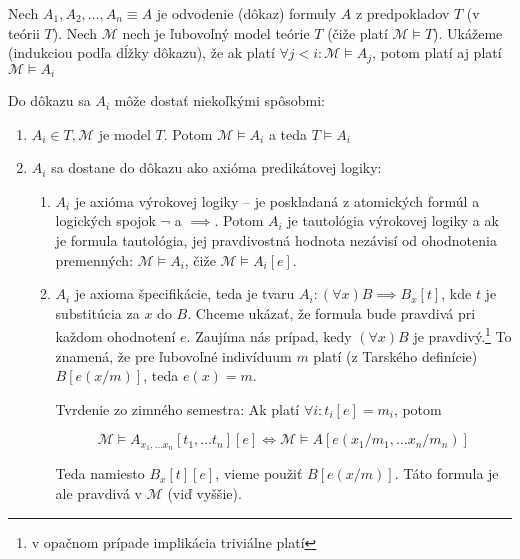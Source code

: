 \begin{dokaz}
    Nech $A_1, A_2, \ldots, A_n\equiv A$ je odvodenie (dôkaz) formuly $A$
    z predpokladov $T$ (v teórii $T$).
    Nech $\mathcal{M}$ nech je ľubovoľný model teórie $T$ 
    (čiže platí $\mathcal{M} \models T$).
    Ukážeme (indukciou podľa dĺžky dôkazu), že 
    ak platí $\forall j<i:\mathcal{M} \models A_j$,
    potom platí aj platí $\mathcal{M} \models A_i$

    Do dôkazu sa $A_i$ môže dostať niekoľkými spôsobmi:
    \begin{enumerate}
    \item $A_i \in T, \mathcal{M}$ je model $T$. Potom 
        $\mathcal{M} \models A_i$ a teda $T \models A_i$

    \item $A_i$ sa dostane do dôkazu ako axióma predikátovej logiky:
    \begin{enumerate}
        \item $A_i$ je axióma výrokovej logiky -- je poskladaná z
            atomických formúl a logických spojok $\neg$ a $\implies$. Potom
            $A_i$ je tautológia výrokovej logiky a ak je formula tautológia,
            jej pravdivostná hodnota nezávisí od ohodnotenia
            premenných:
            $\mathcal{M} \models A_i$, čiže $\mathcal{M} \models A_i[e]$.

        \item $A_i$ je axioma špecifikácie, teda je tvaru 
            $A_i: (\forall x) B \implies B_x[t]$, kde
            $t$ je substitúcia za $x$ do $B$. 
            Chceme ukázať, že formula bude pravdivá
            pri každom ohodnotení $e$.
            Zaujíma nás prípad, kedy $(\forall x) B$ je pravdivý.\footnote{
                v opačnom prípade implikácia triviálne platí}
            To znamená, že pre ľubovoľné indivíduum $m$ platí (z Tarského
            definície) $B[e(x/m)]$, teda $e(x)=m$.
        
            Tvrdenie zo zimného semestra: Ak platí
              $\forall i: t_i[e] = m_i$, potom

            \begin{equation*}
                \mathcal{M} \models A_{x_1, \ldots x_n}[t_1, \ldots t_n][e] 
                    \iff
                \mathcal{M} \models A[e(x_1/m_1, \ldots x_n/m_n)]
            \end{equation*}

            Teda namiesto $B_x[t][e]$, vieme použiť $B[e(x/m)]$.
            Táto formula je ale pravdivá v $\mathcal{M}$ (viď vyššie).


\end{enumerate}
\end{enumerate}
\end{dokaz}
